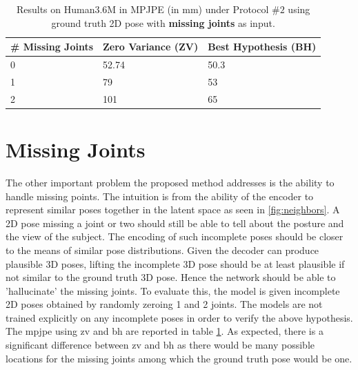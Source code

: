 


\begin{table}[h]
    \centering
    \begin{tabularx}{\linewidth}{XXX}%
        \toprule
        \# Missing Joints & Zero Variance (ZV) & Best Hypothesis (BH)\\
        \midrule \midrule
        0                 & 52.74         & 50.3            \\
        1                 & 79            & 53              \\
        2                 & 101           & 65              \\
        \bottomrule
    \end{tabularx}
    \caption{Results on Human3.6M in MPJPE (in mm) under Protocol $\#2$ using ground truth 2D pose with \textbf{missing joints} as input.}
    \label{table:missing_joints}
    \vspace{-3ex}
\end{table}

\section{Missing Joints}
The other important problem the proposed method addresses is the ability to handle missing points. The intuition is from the ability of the encoder to represent similar poses together in the latent space as seen in \ref{fig:neighbors}. A 2D pose missing a joint or two should still be able to tell about the posture and the view of the subject. The encoding of such incomplete poses should be closer to the means of similar pose distributions. Given the decoder can produce plausible 3D poses, lifting the incomplete 3D pose should be at least plausible if not similar to the ground truth 3D pose. Hence the network should be able to 'hallucinate' the missing joints. To evaluate this, the model is given incomplete 2D poses obtained by randomly zeroing 1 and 2 joints. The models are not trained explicitly on any incomplete poses in order to verify the above hypothesis. The \ac{mpjpe} using \ac{zv} and \ac{bh} are reported in table \ref{table:missing_joints}. As expected, there is a significant difference between \ac{zv} and \ac{bh} as there would be many possible locations for the missing joints among which the ground truth pose would be one.
